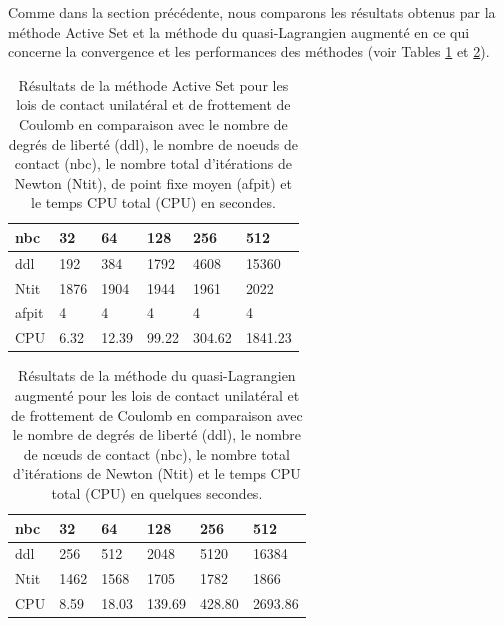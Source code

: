 Comme dans la section précédente, nous comparons les résultats obtenus par la méthode Active Set et la méthode du quasi-Lagrangien augmenté en ce qui concerne la convergence et les performances des méthodes (voir Tables \ref{tab7_def} et \ref{tab8_def}). 
\begin{table}[htbp!]
\begin{tabular}{ |p{1.8cm}|p{1.8cm}|p{1.8cm}|p{1.8cm}|p{1.8cm}|p{1.8cm}| }
 \hline \rowcolor{lightgray}
			nbc  & 32 & 64 & 128 & 256 & 512 \\
			\hline
			ddl & 192 & 384 & 1792 & 4608 & 15360  \\
			Ntit &  1876 & 1904 & 1944 & 1961 & 2022  \\
			afpit &  4 & 4 & 4 & 4 & 4  \\
			CPU &  6.32 & 12.39 & 99.22 & 304.62 & 1841.23   \\
\hline
\end{tabular}
	\caption{Résultats de la méthode Active Set pour les lois de contact unilatéral et de frottement de Coulomb en comparaison avec le nombre de degrés de liberté (ddl), le nombre de noeuds de contact (nbc), le nombre total d'itérations de Newton (Ntit), de point fixe moyen (afpit) et le temps CPU total (CPU) en secondes.} \label{tab7_def}
\end{table}

\begin{table}[htbp!]
\begin{tabular}{ |p{1.8cm}|p{1.8cm}|p{1.8cm}|p{1.8cm}|p{1.8cm}|p{1.8cm}| }
 \hline \rowcolor{lightgray}
			nbc  & 32 & 64 & 128 & 256 & 512 \\
			\hline
			ddl & 256 & 512 & 2048 & 5120 & 16384  \\
			Ntit &  1462 & 1568 & 1705 & 1782 & 1866  \\
			CPU &  8.59 & 18.03 & 139.69 & 428.80 & 2693.86   \\
\hline
\end{tabular}
	\caption{Résultats de la méthode du quasi-Lagrangien augmenté pour les lois de contact unilatéral et de frottement de Coulomb en comparaison avec le nombre de degrés de liberté (ddl), le nombre de nœuds de contact (nbc), le nombre total d'itérations de Newton (Ntit) et le temps CPU total (CPU) en quelques secondes.} \label{tab8_def}
\end{table}

